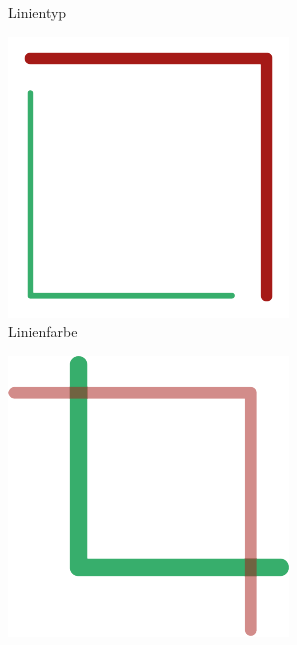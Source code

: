 \begin{figure}[h!tbp]
\begin{subfigure}{.25\textwidth}
  \caption*{Linientyp}
\end{subfigure}%
\begin{subfigure}{.25\textwidth}
  \centering
  \includegraphics[width=\linewidth]{bilder/vektor_pfadLayoutattributeC.pdf}
  \caption*{Linienfarbe}
\end{subfigure}%
\begin{subfigure}{.25\textwidth}
  \centering
  \includegraphics[width=\linewidth]{bilder/vektor_pfadLayoutattributeD.pdf}

\end{subfigure}
\end{figure}
